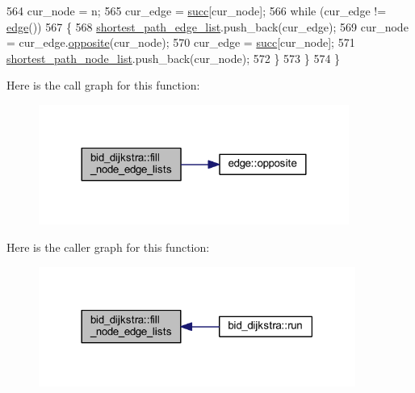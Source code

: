 \begin{DoxyCode}
564     cur\_node = n;
565     cur\_edge = \mbox{\hyperlink{classbid__dijkstra_a7379d185faf9af3820b8292676f9d88a}{succ}}[cur\_node];
566     \textcolor{keywordflow}{while} (cur\_edge != \mbox{\hyperlink{classedge}{edge}}())
567     \{
568         \mbox{\hyperlink{classbid__dijkstra_a4b7bdbc4d016748b40ca925cf1e6f778}{shortest\_path\_edge\_list}}.push\_back(cur\_edge);
569         cur\_node = cur\_edge.\mbox{\hyperlink{classedge_ab64dc3659c9003337b0c3749a8b879cf}{opposite}}(cur\_node);
570         cur\_edge = \mbox{\hyperlink{classbid__dijkstra_a7379d185faf9af3820b8292676f9d88a}{succ}}[cur\_node];
571         \mbox{\hyperlink{classbid__dijkstra_a70041b0a90fb840e141126fe7a6119db}{shortest\_path\_node\_list}}.push\_back(cur\_node);
572     \}
573     \}
574 \}
\end{DoxyCode}
Here is the call graph for this function\+:\nopagebreak
\begin{figure}[H]
\begin{center}
\leavevmode
\includegraphics[width=288pt]{classbid__dijkstra_a279264a4cee9a4a8ad45ec957245e90a_cgraph}
\end{center}
\end{figure}
Here is the caller graph for this function\+:\nopagebreak
\begin{figure}[H]
\begin{center}
\leavevmode
\includegraphics[width=294pt]{classbid__dijkstra_a279264a4cee9a4a8ad45ec957245e90a_icgraph}
\end{center}
\end{figure}
\mbox{\label{classbid__dijkstra_a3736aecbafb02384dd684d6d4fa4bd8d}} 
